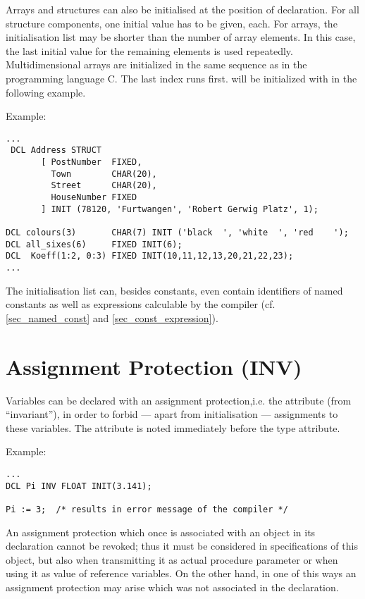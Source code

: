 Arrays and structures can also be initialised at the position of
declaration. For all structure components, one initial value has to be
given, each. For arrays, the initialisation list may be shorter than the
number of array elements. In this case, the last initial value for the
remaining elements is used repeatedly.
Multidimensional arrays are initialized in the same sequence as in the 
programming language C. The last index runs first.
 will be initialized with  in the following example.

Example:

\begin{lstlisting}
...
 DCL Address STRUCT 
       [ PostNumber  FIXED,
         Town        CHAR(20),
         Street      CHAR(20),
         HouseNumber FIXED
       ] INIT (78120, 'Furtwangen', 'Robert Gerwig Platz', 1);

DCL colours(3)       CHAR(7) INIT ('black  ', 'white  ', 'red    ');
DCL all_sixes(6)     FIXED INIT(6);
DCL  Koeff(1:2, 0:3) FIXED INIT(10,11,12,13,20,21,22,23);
... 
\end{lstlisting}

The initialisation list can, besides constants, even contain identifiers
of named constants as well as expressions calculable by the compiler
(cf. \ref{sec_named_const} and \ref{sec_const_expression}).

\section{Assignment Protection (INV)}    %
\label{sec_inv}

Variables can be declared with an assignment protection,i.e. the attribute
 (from ``invariant''), in order to forbid --- apart from
initialisation --- assignments to these variables. The attribute  is
noted immediately before the type attribute.

Example:

\begin{lstlisting}
...
DCL Pi INV FLOAT INIT(3.141);

Pi := 3;  /* results in error message of the compiler */
\end{lstlisting}

An assignment protection which once is associated with an object in its
declaration cannot be revoked; thus it must be considered in
specifications of this object, but also when transmitting it as actual
procedure parameter or when using it as value of reference variables. On
the other hand, in one of this ways an assignment protection may arise
which was not associated in the declaration.


